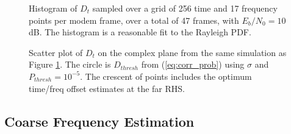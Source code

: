 \documentclass{article}
\begin{document}
\begin{figure}[H]
\caption{Histogram of $D_t$ sampled over a grid of 256 time and 17 frequency points per modem frame, over a total of 47 frames, with $E_b/N_0=10$ dB. The histogram is a reasonable fit to the Rayleigh PDF.}
\label{fig:acq_dt_hist}
\begin{center}

\end{center}
\end{figure}

\begin{figure}[H]
\caption{Scatter plot of $D_t$ on the complex plane from the same simulation as Figure \ref{fig:acq_dt_hist}. The circle is $D_{thresh}$ from (\ref{eq:corr_prob}) using $\sigma$ and $P_{thresh}=10^{-5}$. The crescent of points includes the optimum time/freq offset estimates at the far RHS.}
\label{fig:acq_dt_scatter}
\begin{center}

\end{center}
\end{figure}

\subsection{Coarse Frequency Estimation}
\end{document}
